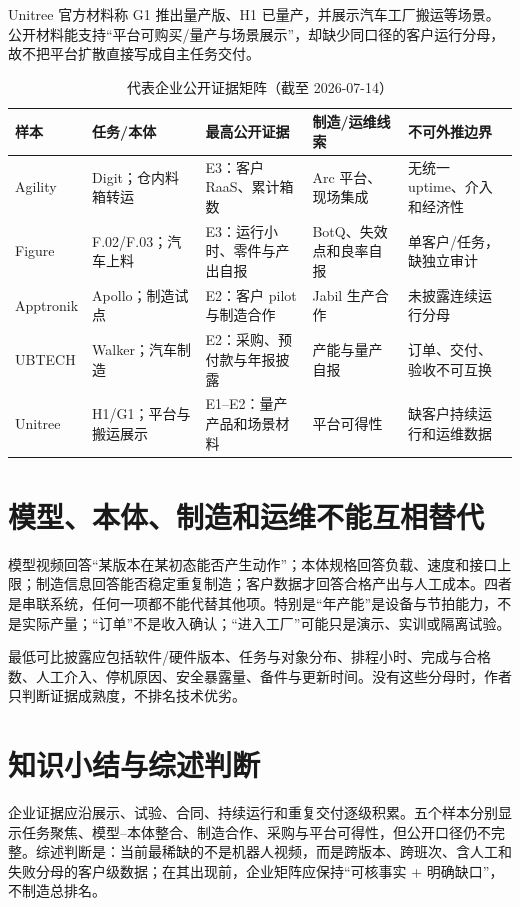 Unitree 官方材料称 G1 推出量产版、H1 已量产，并展示汽车工厂搬运等场景\cite{unitree2024wrc}。公开材料能支持“平台可购买/量产与场景展示”，却缺少同口径的客户运行分母，故不把平台扩散直接写成自主任务交付。

\begin{table}[H]
\begingroup{}
\centering\small
\caption{代表企业公开证据矩阵（截至 2026-07-14）}
\label{tab:company-evidence-matrix}
\begin{tabularx}{\textwidth}{p{}p{}p{}p{}Y}
\toprule
样本 & 任务/本体 & 最高公开证据 & 制造/运维线索 & 不可外推边界 \\
\midrule
Agility & Digit；仓内料箱转运 & E3：客户 RaaS、累计箱数 & Arc 平台、现场集成 & 无统一 uptime、介入和经济性 \\
Figure & F.02/F.03；汽车上料 & E3：运行小时、零件与产出自报 & BotQ、失效点和良率自报 & 单客户/任务，缺独立审计 \\
Apptronik & Apollo；制造试点 & E2：客户 pilot 与制造合作 & Jabil 生产合作 & 未披露连续运行分母 \\
UBTECH & Walker；汽车制造 & E2：采购、预付款与年报披露 & 产能与量产自报 & 订单、交付、验收不可互换 \\
Unitree & H1/G1；平台与搬运展示 & E1--E2：量产产品和场景材料 & 平台可得性 & 缺客户持续运行和运维数据 \\
\bottomrule
\end{tabularx}
\endgroup
\end{table}

\section{模型、本体、制造和运维不能互相替代}

模型视频回答“某版本在某初态能否产生动作”；本体规格回答负载、速度和接口上限；制造信息回答能否稳定重复制造；客户数据才回答合格产出与人工成本。四者是串联系统，任何一项都不能代替其他项。特别是“年产能”是设备与节拍能力，不是实际产量；“订单”不是收入确认；“进入工厂”可能只是演示、实训或隔离试验。

最低可比披露应包括软件/硬件版本、任务与对象分布、排程小时、完成与合格数、人工介入、停机原因、安全暴露量、备件与更新时间。没有这些分母时，作者只判断证据成熟度，不排名技术优劣。

\section{知识小结与综述判断}

企业证据应沿展示、试验、合同、持续运行和重复交付逐级积累。五个样本分别显示任务聚焦、模型--本体整合、制造合作、采购与平台可得性，但公开口径仍不完整。综述判断是：当前最稀缺的不是机器人视频，而是跨版本、跨班次、含人工和失败分母的客户级数据；在其出现前，企业矩阵应保持“可核事实 + 明确缺口”，不制造总排名。
